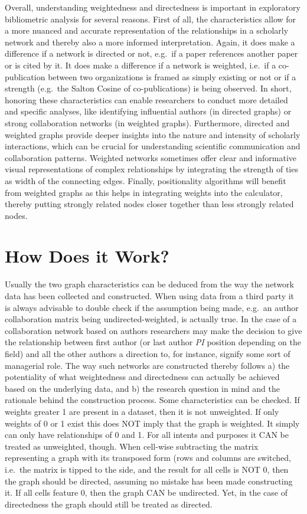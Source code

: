 \documentclass[
  letterpaper,
]{scrreprt}
\begin{document}
Overall, understanding weightedness and directedness is important in
exploratory bibliometric analysis for several reasons. First of all, the
characteristics allow for a more nuanced and accurate representation of
the relationships in a scholarly network and thereby also a more
informed interpretation. Again, it does make a difference if a network
is directed or not, e.g.~if a paper references another paper or is cited
by it. It does make a difference if a network is weighted, i.e.~if a
co-publication between two organizations is framed as simply existing or
not or if a strength (e.g.~the Salton Cosine of co-publications) is
being observed. In short, honoring these characteristics can enable
researchers to conduct more detailed and specific analyses, like
identifying influential authors (in directed graphs) or strong
collaboration networks (in weighted graphs). Furthermore, directed and
weighted graphs provide deeper insights into the nature and intensity of
scholarly interactions, which can be crucial for understanding
scientific communication and collaboration patterns. Weighted networks
sometimes offer clear and informative visual representations of complex
relationships by integrating the strength of ties as width of the
connecting edges. Finally, positionality algorithms will benefit from
weighted graphs as this helps in integrating weights into the
calculator, thereby putting strongly related nodes closer together than
less strongly related nodes.

\section{How Does it Work?}\label{how-does-it-work-8}

Usually the two graph characteristics can be deduced from the way the
network data has been collected and constructed. When using data from a
third party it is always advisable to double check if the assumption
being made, e.g.~an author collaboration matrix being
undirected-weighted, is actually true. In the case of a collaboration
network based on authors researchers may make the decision to give the
relationship between first author (or last author \emph{PI} position
depending on the field) and all the other authors a direction to, for
instance, signify some sort of managerial role. The way such networks
are constructed thereby follows a) the potentiality of what weightedness
and directedness can actually be achieved based on the underlying data,
and b) the research question in mind and the rationale behind the
construction process. Some characteristics can be checked. If weights
greater 1 are present in a dataset, then it is not unweighted. If only
weights of 0 or 1 exist this does NOT imply that the graph is weighted.
It simply can only have relationships of 0 and 1. For all intents and
purposes it CAN be treated as unweighted, though. When cell-wise
subtracting the matrix representing a graph with its transposed form
(rows and columns are switched, i.e.~the matrix is tipped to the side,
and the result for all cells is NOT 0, then the graph should be
directed, assuming no mistake has been made constructing it. If all
cells feature 0, then the graph CAN be undirected. Yet, in the case of
directedness the graph should still be treated as directed.
\end{document}
